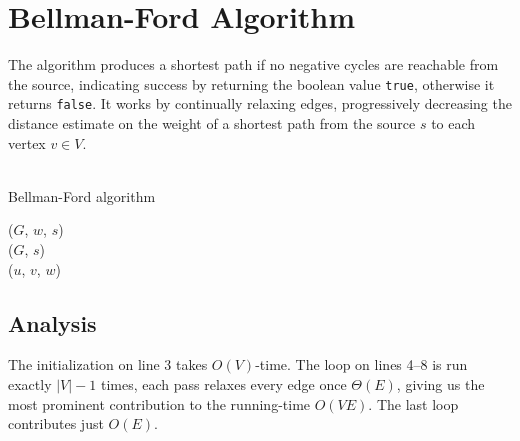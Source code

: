 \section{Bellman-Ford Algorithm}
The algorithm produces a shortest path if no negative cycles are reachable
from the source, indicating success by returning the boolean value
\texttt{true}, otherwise it returns \texttt{false}. It works by continually
relaxing edges, progressively decreasing the distance estimate on the weight
of a shortest path from the source $s$ to each vertex $v \in V$.
\\\\
\begin{algorithm}[H]
	\caption{Bellman-Ford algorithm}
	\label{alg:bellman-ford}
	
	
	
	
	
	\BlankLine
	\BellmanFord($G$, $w$, $s$) \\
	\Begin
	{
		\InitSingleSource($G$, $s$) \\
		{
			{
				\Relax($u$, $v$, $w$)
			}
		}
		{
		}
		\Return \True
	}
\end{algorithm}

\subsection{Analysis}
The initialization on line 3 takes $O(V)$-time. The loop on lines 4--8 is run
exactly $|V|-1$ times, each pass relaxes every edge once $\Theta(E)$, giving
us the most prominent contribution to the running-time $O(VE)$. The last loop
contributes just $O(E)$.

\newpage
